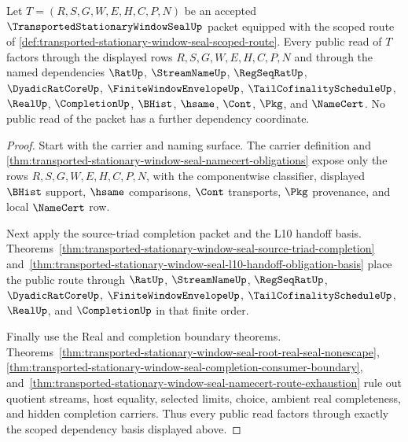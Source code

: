\begin{theorem}
\label{thm:transported-stationary-window-seal-scoped-dependency-basis}
Let $T=(R,S,G,W,E,H,C,P,N)$ be an accepted $\TransportedStationaryWindowSealUp$ packet equipped with the scoped route of \autoref{def:transported-stationary-window-seal-scoped-route}. Every public read of $T$ factors through the displayed rows $R,S,G,W,E,H,C,P,N$ and through the named dependencies $\RatUp$, $\StreamNameUp$, $\RegSeqRatUp$, $\DyadicRatCoreUp$, $\FiniteWindowEnvelopeUp$, $\TailCofinalityScheduleUp$, $\RealUp$, $\CompletionUp$, $\BHist$, $\hsame$, $\Cont$, $\Pkg$, and $\NameCert$. No public read of the packet has a further dependency coordinate.
\end{theorem}
\begin{proof}
Start with the carrier and naming surface. The carrier definition and \autoref{thm:transported-stationary-window-seal-namecert-obligations} expose only the rows $R,S,G,W,E,H,C,P,N$, with the componentwise classifier, displayed $\BHist$ support, $\hsame$ comparisons, $\Cont$ transports, $\Pkg$ provenance, and local $\NameCert$ row.

Next apply the source-triad completion packet and the L10 handoff basis. Theorems~\ref{thm:transported-stationary-window-seal-source-triad-completion} and~\ref{thm:transported-stationary-window-seal-l10-handoff-obligation-basis} place the public route through $\RatUp$, $\StreamNameUp$, $\RegSeqRatUp$, $\DyadicRatCoreUp$, $\FiniteWindowEnvelopeUp$, $\TailCofinalityScheduleUp$, $\RealUp$, and $\CompletionUp$ in that finite order.

Finally use the Real and completion boundary theorems. Theorems~\ref{thm:transported-stationary-window-seal-root-real-seal-nonescape}, \ref{thm:transported-stationary-window-seal-completion-consumer-boundary}, and~\ref{thm:transported-stationary-window-seal-namecert-route-exhaustion} rule out quotient streams, host equality, selected limits, choice, ambient real completeness, and hidden completion carriers. Thus every public read factors through exactly the scoped dependency basis displayed above.
\end{proof}

